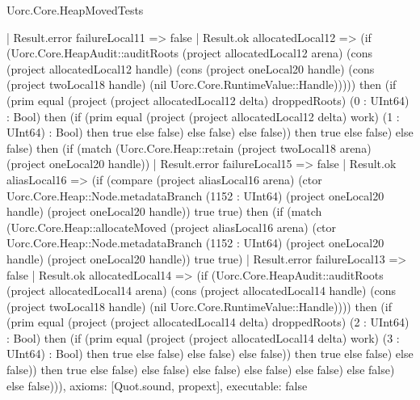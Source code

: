 \begin{lexlean}{Uorc.Core.HeapMovedTests}
\begin{semanticmodule}
{        | Result.error failureLocal11 => false
        | Result.ok allocatedLocal12 => (if (Uorc.Core.HeapAudit::auditRoots (project allocatedLocal12 arena) (cons (project allocatedLocal12 handle) (cons (project oneLocal20 handle) (cons (project twoLocal18 handle) (nil Uorc.Core.RuntimeValue::Handle))))) then (if (prim equal (project (project allocatedLocal12 delta) droppedRoots) (0 : UInt64) : Bool) then (if (prim equal (project (project allocatedLocal12 delta) work) (1 : UInt64) : Bool) then true else false) else false) else false)) then true else false) else false) then (if (match (Uorc.Core.Heap::retain (project twoLocal18 arena) (project oneLocal20 handle))
        | Result.error failureLocal15 => false
        | Result.ok aliasLocal16 => (if (compare (project aliasLocal16 arena) (ctor Uorc.Core.Heap::Node.metadataBranch (1152 : UInt64) (project oneLocal20 handle) (project oneLocal20 handle)) true true) then (if (match (Uorc.Core.Heap::allocateMoved (project aliasLocal16 arena) (ctor Uorc.Core.Heap::Node.metadataBranch (1152 : UInt64) (project oneLocal20 handle) (project oneLocal20 handle)) true true)
          | Result.error failureLocal13 => false
          | Result.ok allocatedLocal14 => (if (Uorc.Core.HeapAudit::auditRoots (project allocatedLocal14 arena) (cons (project allocatedLocal14 handle) (cons (project twoLocal18 handle) (nil Uorc.Core.RuntimeValue::Handle)))) then (if (prim equal (project (project allocatedLocal14 delta) droppedRoots) (2 : UInt64) : Bool) then (if (prim equal (project (project allocatedLocal14 delta) work) (3 : UInt64) : Bool) then true else false) else false) else false)) then true else false) else false)) then true else false) else false) else false) else false) else false) else false) else false))),
  axioms: [Quot.sound, propext],
  executable: false
}


\end{semanticmodule}
\end{lexlean}
